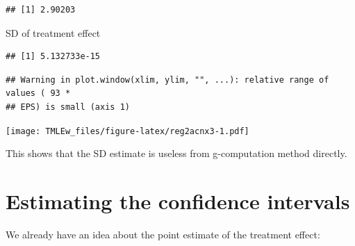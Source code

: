 \documentclass[
]{book}
\newenvironment{Shaded}{\begin{snugshade}}{\end{snugshade}}
\newcommand{\AttributeTok}[1]{\textcolor[rgb]{0.77,0.63,0.00}{#1}}
\newcommand{\DecValTok}[1]{\textcolor[rgb]{0.00,0.00,0.81}{#1}}
\newcommand{\FunctionTok}[1]{\textcolor[rgb]{0.00,0.00,0.00}{#1}}
\newcommand{\NormalTok}[1]{#1}
\newcommand{\SpecialCharTok}[1]{\textcolor[rgb]{0.00,0.00,0.00}{#1}}
\newcommand{\StringTok}[1]{\textcolor[rgb]{0.31,0.60,0.02}{#1}}
\begin{document}
\begin{verbatim}
## [1] 2.90203
\end{verbatim}

SD of treatment effect

\begin{Shaded}
\end{Shaded}

\begin{verbatim}
## [1] 5.132733e-15
\end{verbatim}

\begin{Shaded}
\end{Shaded}

\begin{verbatim}
## Warning in plot.window(xlim, ylim, "", ...): relative range of values ( 93 *
## EPS) is small (axis 1)
\end{verbatim}

\begin{Shaded}
\end{Shaded}

\texttt{[image: TMLEw\_files/figure-latex/reg2acnx3-1.pdf]}

This shows that the SD estimate is useless from g-computation method directly.

\hypertarget{estimating-the-confidence-intervals}{%
\section{Estimating the confidence intervals}\label{estimating-the-confidence-intervals}}

We already have an idea about the point estimate of the treatment effect:
\end{document}
